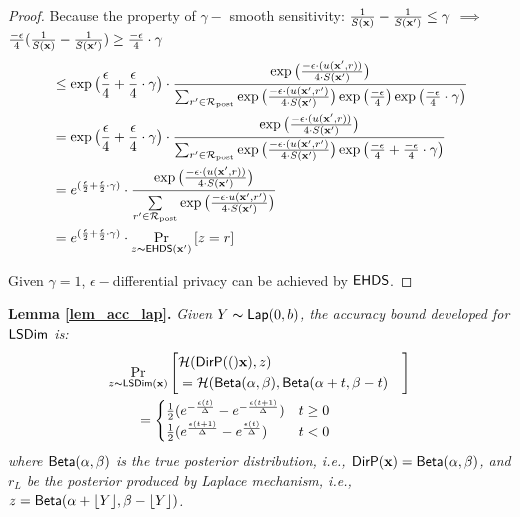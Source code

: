 \documentclass{article}
\begin{document}
\begin{proof}
  Because the property of $\gamma -$ smooth sensitivity: $\frac{1}{S(\textbf{x})} - \frac{1}{S(\textbf{x}')} \leq \gamma$ $\implies$
  $\frac{- \epsilon}{4}
  (\frac{1}{S(\textbf{x})}-
  \frac{1}{S(\textbf{x}')}) \geq \frac{- \epsilon}{4} \cdot \gamma$
  \begin{equation*}
  \begin{split}
  & \leq \exp\big( \frac{\epsilon}{4} + \frac{\epsilon}{4} \cdot \gamma\big) \cdot 
  \frac {
  \exp
  \big(
  \frac{-\epsilon\cdot(u(\textbf{x}', {r}))}{4\cdot S(\textbf{x}')}
  \big)
  } 
  {
  \sum_{r'\in \mathcal{R}_{\textup{post}}} 
  \exp 
  \big(
  \frac{-\epsilon\cdot(u(\textbf{x}', {r'})}{4 \cdot S(\textbf{x}')}
  \big)
  \exp 
  \big(
  \frac{-\epsilon}{4}
  \big)
  \exp
  \big(
  \frac{- \epsilon}{4} \cdot \gamma
  \big)
  }\\
  & = \exp\big( \frac{\epsilon}{4} + \frac{\epsilon}{4} \cdot \gamma\big) \cdot 
  \frac {
  \exp
  \big(
  \frac{-\epsilon\cdot(u(\textbf{x}', {r}))}{4\cdot S(\textbf{x}')}
  \big)
  } 
  {
  \sum_{r'\in \mathcal{R}_{\textup{post}}} 
  \exp 
  \big(
  \frac{-\epsilon\cdot(u(\textbf{x}', {r'})}{4 \cdot S(\textbf{x}')}
  \big)
  \exp 
  \big(
  \frac{-\epsilon}{4} +   \frac{- \epsilon}{4} \cdot \gamma
  \big)
  }\\
  & = e^{( \frac{\epsilon}{2} + \frac{\epsilon}{2} \cdot \gamma )} \cdot 
  \frac {
  \exp
  \big(
  \frac{-\epsilon\cdot(u(\textbf{x}', {r}))}{4\cdot S(\textbf{x}')}
  \big)
  } 
  {
  \sum\limits_{r'\in \mathcal{R}_{\textup{post}}} \exp \big(\frac{-\epsilon\cdot u(\textbf{x}', r')}{4 \cdot S(\textbf{x}')}\big)
  }\\
  & = e^{( \frac{\epsilon}{2} + \frac{\epsilon}{2} \cdot \gamma )} \cdot   \underset{z \thicksim \mathsf{EHDS}(\textbf{x}')}{\Pr}\left[ z = r \right]
  \end{split}
  \end{equation*}

  Given $\gamma = 1$, $\epsilon - $differential privacy can be achieved by $\mathsf{EHDS}$.


\end{proof}


\noindent \textbf{ Lemma \ref{lem_acc_lap}.}
\emph{
Given $Y \thicksim \mathsf{Lap}(0, b)$, the accuracy bound developed for $\mathsf{LSDim}$ is:
\begin{align*}
&
\lapmechPr{\dataobs}{
\begin{aligned}
\lefteqn{\hellinger(\bysinfer(\dataobs), z )}\\ 
&= \hellinger(\betad(\alpha, \beta), \betad(\alpha + t, \beta - t)
\end{aligned}
}
\\
&\qquad = 
\begin{cases}
\frac{1}{2} (e^{- \frac{\epsilon (t)}{\Delta }} - e^{- \frac{\epsilon (t + 1)}{\Delta }}) &  t \geq 0\\
\frac{1}{2} (e^{\frac{\epsilon (t + 1)}{\Delta }} - e^{\frac{\epsilon (t)}{\Delta }}) & t < 0
\end{cases}
\end{align*}
where $\mathsf{Beta}(\alpha, \beta)$ is the true posterior distribution, i.e., $\mathsf{DirP}(\textbf{x}) = \mathsf{Beta}(\alpha, \beta)$, and $r_L$ be the posterior produced by Laplace mechanism, i.e., $z = \mathsf{Beta}(\alpha + \lfloor Y \rfloor, \beta - \lfloor Y \rfloor)$.
}
\end{document}
